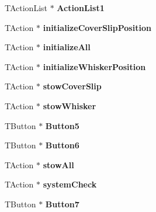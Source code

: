 \begin{DoxyCompactItemize}
\item 
T\+Action\+List $\ast$ {\bfseries Action\+List1}\hypertarget{class_t_main_a732cc0fae2ce8b8a959c412e9dc08c04}{}\label{class_t_main_a732cc0fae2ce8b8a959c412e9dc08c04}

\item 
T\+Action $\ast$ {\bfseries initialize\+Cover\+Slip\+Position}\hypertarget{class_t_main_a2295cc77a9a4d40581d7ce264493aacc}{}\label{class_t_main_a2295cc77a9a4d40581d7ce264493aacc}

\item 
T\+Action $\ast$ {\bfseries initialize\+All}\hypertarget{class_t_main_a34e832a32d1b1bde389df1e6c2ba0375}{}\label{class_t_main_a34e832a32d1b1bde389df1e6c2ba0375}

\item 
T\+Action $\ast$ {\bfseries initialize\+Whisker\+Position}\hypertarget{class_t_main_a5ad2dabaa2154542667f26bbd0dfd5a4}{}\label{class_t_main_a5ad2dabaa2154542667f26bbd0dfd5a4}

\item 
T\+Action $\ast$ {\bfseries stow\+Cover\+Slip}\hypertarget{class_t_main_afda25ef6c5ee6ebbea6cc69addf95fa9}{}\label{class_t_main_afda25ef6c5ee6ebbea6cc69addf95fa9}

\item 
T\+Action $\ast$ {\bfseries stow\+Whisker}\hypertarget{class_t_main_a2c198755c8806924484a78dea2c2ecb2}{}\label{class_t_main_a2c198755c8806924484a78dea2c2ecb2}

\item 
T\+Button $\ast$ {\bfseries Button5}\hypertarget{class_t_main_a9452d517f672a179027ce3e842b1d94c}{}\label{class_t_main_a9452d517f672a179027ce3e842b1d94c}

\item 
T\+Button $\ast$ {\bfseries Button6}\hypertarget{class_t_main_af83e5753c701ec57a3ad0397b11c0311}{}\label{class_t_main_af83e5753c701ec57a3ad0397b11c0311}

\item 
T\+Action $\ast$ {\bfseries stow\+All}\hypertarget{class_t_main_ad650795c611013e1aefa56bb59d4ea2e}{}\label{class_t_main_ad650795c611013e1aefa56bb59d4ea2e}

\item 
T\+Action $\ast$ {\bfseries system\+Check}\hypertarget{class_t_main_ac66233e9b3dbb245358581e4dce00b7d}{}\label{class_t_main_ac66233e9b3dbb245358581e4dce00b7d}

\item 
T\+Button $\ast$ {\bfseries Button7}\hypertarget{class_t_main_aec2adc10a2cc682046bfd306f555f3a5}{}\label{class_t_main_aec2adc10a2cc682046bfd306f555f3a5}


\end{DoxyCompactItemize}
